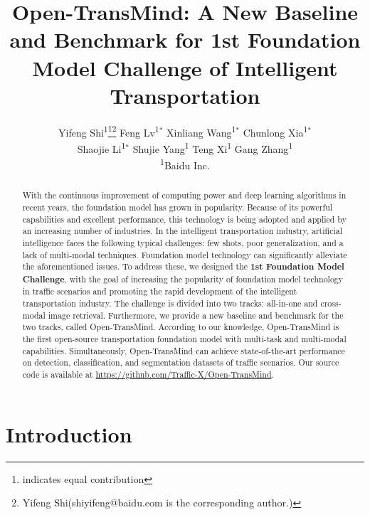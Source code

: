 \documentclass[10pt,twocolumn,letterpaper]{article}
\begin{document}
\title{Open-TransMind: A New Baseline and Benchmark for 1st Foundation Model Challenge of Intelligent Transportation}

\author
{ 
Yifeng Shi\textsuperscript{1}\thanks{indicates equal contribution}\thanks{Yifeng Shi(shiyifeng@baidu.com is the corresponding author.)}
\quad
Feng Lv\textsuperscript{1}$^*$
\quad
Xinliang Wang\textsuperscript{1}$^*$
\quad
Chunlong Xia\textsuperscript{1}$^*$\\
\quad
Shaojie Li\textsuperscript{1}$^*$
\quad
Shujie Yang\textsuperscript{1}
\quad
Teng Xi\textsuperscript{1}
\quad
Gang Zhang\textsuperscript{1}
\\[1em]
 \textsuperscript{1}Baidu Inc.
\quad
}

\maketitle

\begin{abstract}
With the continuous improvement of computing power and deep learning algorithms in recent years, the foundation model has grown in popularity. Because of its powerful capabilities and excellent performance, this technology is being adopted and applied by an increasing number of industries. In the intelligent transportation industry, artificial intelligence faces the following typical challenges: few shots, poor generalization, and a lack of multi-modal techniques. Foundation model technology can significantly alleviate the aforementioned issues. To address these, we designed the \textbf{1st Foundation Model Challenge}, with the goal of increasing the popularity of foundation model technology in traffic scenarios and promoting the rapid development of the intelligent transportation industry.
The challenge is divided into two tracks: all-in-one and cross-modal image retrieval. Furthermore, we provide a new baseline and benchmark for the two tracks, called Open-TransMind. According to our knowledge, Open-TransMind is the first open-source transportation foundation model with multi-task and multi-modal capabilities. Simultaneously, Open-TransMind can achieve state-of-the-art performance on detection, classification, and segmentation datasets of traffic scenarios. Our source code is available at \url{https://github.com/Traffic-X/Open-TransMind}.
\end{abstract}

\section{Introduction}
\label{sec:intro}
\end{document}
